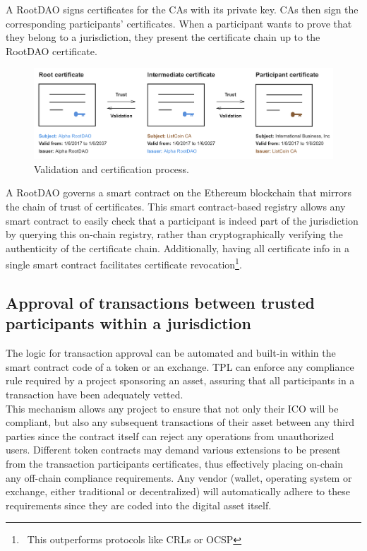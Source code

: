 \documentclass[10pt]{article}
\begin{document}
\noindent A RootDAO signs certificates for the CAs with its private key. CAs then sign the corresponding participants' certificates. When a participant wants to prove that they belong to a jurisdiction, they present the certificate chain up to the RootDAO certificate.\\

\begin{figure}[ht]
    \centering
    \includegraphics[width=0.8\linewidth]{figures/figure3.png}
    \caption{Validation and certification process.}
    \label{fig:fig3}
\end{figure}

\noindent A RootDAO governs a smart contract on the Ethereum\cite{ethereum} blockchain that mirrors the chain of trust of certificates. This smart contract-based registry allows any smart contract to easily check that a participant is indeed part of the jurisdiction by querying this on-chain registry, rather than cryptographically verifying the authenticity of the certificate chain. Additionally, having all certificate info in a single smart contract facilitates certificate revocation\footnote{\ This outperforms protocols like CRLs or OCSP}.\\

\subsection{Approval of transactions between trusted participants within a jurisdiction}
The logic for transaction approval can be automated and built-in within the smart contract code of a token or an exchange. TPL can enforce any compliance rule required by a project sponsoring an asset, assuring that all participants in a transaction have been adequately vetted.\\

\noindent This mechanism allows any project to ensure that not only their ICO will be compliant, but also any subsequent transactions of their asset between any third parties since the contract itself can reject any operations from unauthorized users. Different token contracts may demand various extensions to be present from the transaction participants certificates, thus effectively placing on-chain any off-chain compliance requirements. Any vendor (wallet, operating system or exchange, either traditional or decentralized) will automatically adhere to these requirements since they are coded into the digital asset itself.\\
\end{document}
